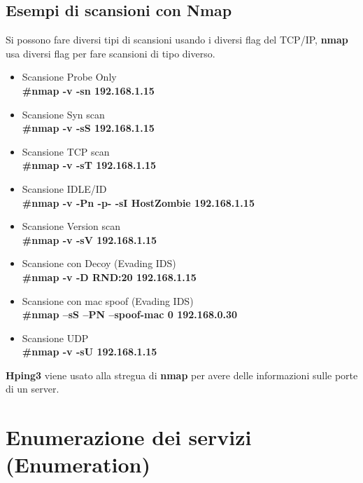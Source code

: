 \subsection{Esempi di scansioni con Nmap}
Si possono fare diversi tipi di scansioni usando i diversi flag del TCP/IP, \textbf{nmap}\cite{nmap}
usa diversi flag per fare scansioni di tipo diverso.
\begin{itemize}
    \item Scansione Probe Only \\
      \textbf{ \#nmap  -v -sn 192.168.1.15}
    \item Scansione Syn scan \\
        \textbf{ \#nmap  -v -sS 192.168.1.15}
    \item Scansione TCP scan \\
        \textbf{ \#nmap  -v -sT 192.168.1.15}
    \item Scansione IDLE/ID \\
        \textbf{ \#nmap  -v -Pn -p- -sI HostZombie 192.168.1.15} 
    \item Scansione Version scan \\
        \textbf{ \#nmap  -v -sV 192.168.1.15} 
     \item Scansione con Decoy (Evading IDS) \\
        \textbf{ \#nmap -v -D RND:20 192.168.1.15}     
     \item Scansione con mac spoof (Evading IDS)\\
        \textbf{ \#nmap –sS –PN –spoof-mac 0 192.168.0.30}
    \item Scansione UDP \\
        \textbf{ \#nmap  -v -sU 192.168.1.15}
\end{itemize}

\textbf{ Hping3}\cite{hping3} viene usato alla stregua di \textbf{nmap}\cite{nmap} per avere delle informazioni sulle porte di un server.

\section{ Enumerazione  dei servizi (Enumeration)}

